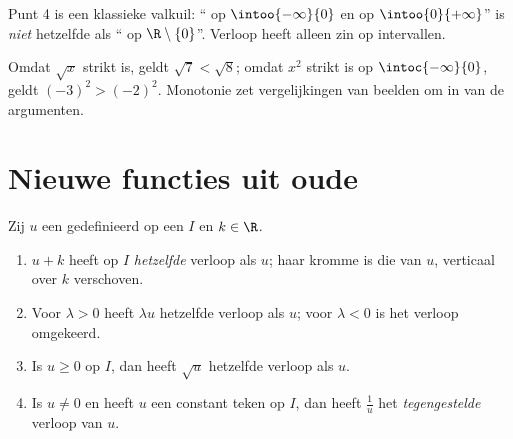 \begin{remark}
Punt 4 is een klassieke valkuil: `` op $\intoo{-\infty}{0}$ en op
$\intoo{0}{+\infty}$'' is \emph{niet} hetzelfde als `` op
$\R \setminus \{0\}$''. Verloop heeft alleen zin op intervallen.
\end{remark}

\begin{example}
Omdat $\sqrt x$ strikt  is, geldt $\sqrt{7} < \sqrt{8}$; omdat $x^2$
strikt  is op $\intoc{-\infty}{0}$, geldt $(-3)^2 > (-2)^2$.
Monotonie zet vergelijkingen van beelden om in  van de
argumenten.
\end{example}

\section{Nieuwe functies uit oude}

\begin{proposition}[Transformaties]\label{prop:g11:func:transforms}
Zij $u$ een  gedefinieerd op een  $I$ en $k \in \R$.
\begin{enumerate}
  \item $u + k$ heeft op $I$ \emph{hetzelfde} verloop als $u$; haar kromme is
        die van $u$, verticaal over $k$ verschoven.
  \item Voor $\lambda > 0$ heeft $\lambda u$ hetzelfde verloop als $u$; voor
        $\lambda < 0$ is het verloop omgekeerd.
  \item Is $u \geq 0$ op $I$, dan heeft $\sqrt u$ hetzelfde verloop als $u$.
  \item Is $u \neq 0$ en heeft $u$ een constant teken op $I$, dan heeft
        $\frac1u$ het \emph{tegengestelde} verloop van $u$.
\end{enumerate}
\end{proposition}

